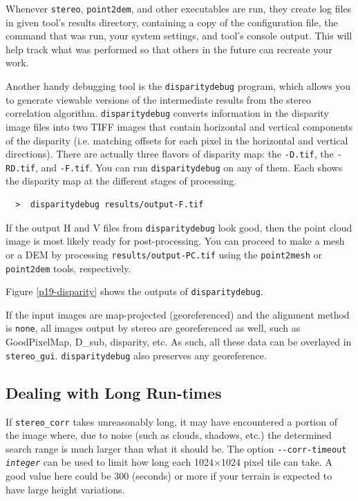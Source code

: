 Whenever \texttt{stereo}, \texttt{point2dem}, and other executables are
run, they create log files in given tool's results directory, containing
a copy of the configuration file, the command that was run, your system
settings, and tool's console output. This will help track what was
performed so that others in the future can recreate your work.

Another handy debugging tool is the \texttt{disparitydebug} program,
which allows you to generate viewable versions of the intermediate
results from the stereo correlation algorithm.
\texttt{disparitydebug} converts information in the disparity image
files into two TIFF images that contain horizontal and vertical
components of the disparity (i.e. matching offsets for each pixel in
the horizontal and vertical directions).  There are actually three
flavors of disparity map: the \texttt{-D.tif}, the \texttt{-RD.tif},
and \texttt{-F.tif}.  You can run \texttt{disparitydebug} on any of
them.  Each shows the disparity map at the different stages of
processing.

\begin{verbatim}
  >  disparitydebug results/output-F.tif
\end{verbatim}

If the output H and V files from \texttt{disparitydebug} look good,
then the point cloud image is most likely ready for post-processing.
You can proceed to make a mesh or a \ac{DEM} by processing
\texttt{results/output-PC.tif} using the \texttt{point2mesh} or
\texttt{point2dem} tools, respectively.

Figure \ref {p19-disparity} shows the outputs of \texttt{disparitydebug}.

If the input images are map-projected (georeferenced) and the alignment
method is \texttt{none}, all images output by stereo are georeferenced
as well, such as GoodPixelMap, D\_sub, disparity, etc. As such, all
these data can be overlayed in
\texttt{stereo\_gui}. \texttt{disparitydebug} also preserves any
georeference.

\subsection{Dealing with Long Run-times}
\label{longrun}

If \texttt{stereo\_corr} takes unreasonably
long, it may have encountered a portion of the image where, due to noise
(such as clouds, shadows, etc.) the determined search range is much
larger than what it should be. The option \texttt{-\/-corr-timeout \textit{integer}}
can be used to limit how long each 1024$\times$1024 pixel tile can take.
A good value here could be 300 (seconds) or more if your terrain is expected
to have large height variations.

